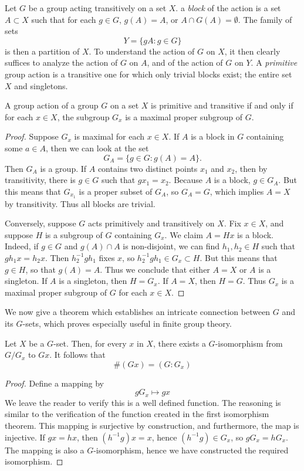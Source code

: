 Let $G$ be a group acting transitively on a set $X$. a \emph{block} of the action is a set $A \subset X$ such that for each $g \in G$, $g(A) = A$, or $A \cap G(A) = \emptyset$. The family of sets
%
\[ Y = \{ gA: g \in G \} \]
%
is then a partition of $X$. To understand the action of $G$ on $X$, it then clearly suffices to analyze the action of $G$ on $A$, and of the action of $G$ on $Y$. A \emph{primitive} group action is a transitive one for which only trivial blocks exist; the entire set $X$ and singletons.

\begin{theorem}
    A group action of a group $G$ on a set $X$ is primitive and transitive if and only if for each $x \in X$, the subgroup $G_x$ is a maximal proper subgroup of $G$.
\end{theorem}
\begin{proof}
    Suppose $G_x$ is maximal for each $x \in X$. If $A$ is a block in $G$ containing some $a \in A$, then we can look at the set
    \[ G_A = \{ g \in G: g(A) = A \}. \]
    Then $G_A$ is a group. If $A$ contains two distinct points $x_1$ and $x_2$, then by transitivity, there is $g \in G$ such that $gx_1 = x_2$. Because $A$ is a block, $g \in G_A$. But this means that $G_{x_1}$ is a proper subset of $G_A$, so $G_A = G$, which implies $A = X$ by transitivity. Thus all blocks are trivial.

    Conversely, suppose $G$ acts primitively and transitively on $X$. Fix $x \in X$, and suppose $H$ is a subgroup of $G$ containing $G_x$. We claim $A = Hx$ is a block. Indeed, if $g \in G$ and $g(A) \cap A$ is non-disjoint, we can find $h_1,h_2 \in H$ such that $gh_1 x = h_2 x$. Then $h_2^{-1}gh_1$ fixes $x$, so $h_2^{-1}gh_1 \in G_x \subset H$. But this means that $g \in H$, so that $g(A) = A$. Thus we conclude that either $A = X$ or $A$ is a singleton. If $A$ is a singleton, then $H = G_x$. If $A = X$, then $H = G$. Thus $G_x$ is a maximal proper subgroup of $G$ for each $x \in X$.
\end{proof}

We now give a theorem which establishes an intricate connection between $G$ and its $G$-sets, which proves especially useful in finite group theory.

\begin{theorem} 
    Let $X$ be a $G$-set. Then, for every $x$ in $X$, there exists a $G$-isomorphism from $G/G_x$ to $Gx$. It follows that
    \[ \#(Gx) = (G:G_x) \]
\end{theorem}
\begin{proof}
    Define a mapping by
    \[ gG_x \mapsto gx \]
    We leave the reader to verify this is a well defined function. The reasoning is similar to the verification of the function created in the first isomorphism theorem. This mapping is surjective by construction, and furthermore, the map is injective. If $gx = hx$, then $(h^{-1}g)x = x$, hence $(h^{-1}g) \in G_x$, so $gG_x = hG_x$. The mapping is also a $G$-isomorphism, hence we have constructed the required isomorphism.
\end{proof}

